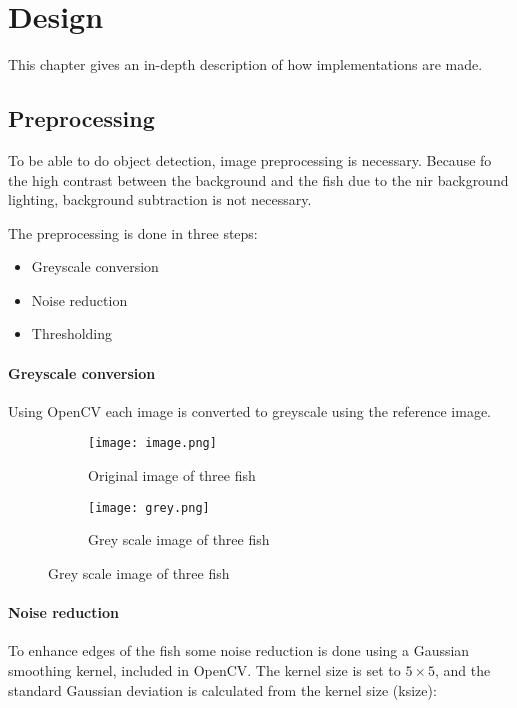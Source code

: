 \graphicspath{{figures/design/}}
\chapter{Design}\label{ch:design}
This chapter gives an in-depth description of how implementations are made. 

\section{Preprocessing}
To be able to do object detection, image preprocessing is necessary. Because fo the high contrast between the background and the fish due to the \gls{nir} background lighting, background subtraction is not necessary. 

The preprocessing is done in three steps:

\begin{itemize}
	\item Greyscale conversion
	\item Noise reduction
	\item Thresholding
\end{itemize}

\subsubsection{Greyscale conversion}
Using OpenCV each image is converted to greyscale using the reference image.

\begin{figure}[H]
	\centering
	\begin{subfigure}[b]{0.43\textwidth}
		\texttt{[image: image.png]}
		\caption{Original image of three fish}
		\label{fig:grey_orig}
	\end{subfigure}
	\begin{subfigure}[b]{0.43\textwidth}
		\texttt{[image: grey.png]}
		\caption{Grey scale image of three fish}
		\label{fig:grey}
	\end{subfigure}
	\label{fig:orig_to_grey}
\end{figure}

\subsubsection{Noise reduction}
To enhance edges of the fish some noise reduction is done using a Gaussian smoothing kernel, included in OpenCV. The kernel size is set to $5 \times 5$, and the standard Gaussian deviation is calculated from the kernel size (ksize):


